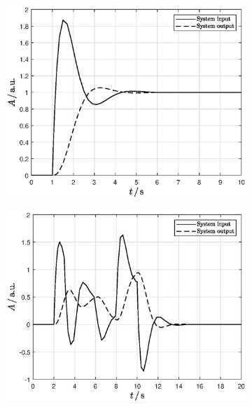 \begin{figure}[ht]
    \hfill
    
    \begin{subfigure}[b]{0.45\textwidth}
    \includegraphics[width=\textwidth]{simulink/simulinkPlotStepSystem.eps}
    \caption{}
    \label{subfig:stepSystem}
    \end{subfigure}
    \begin{subfigure}[b]{0.45\textwidth}
    \includegraphics[width=\textwidth]{simulink/simulinkPlotTrajectorySystem.eps}
    \caption{}
    \label{subfig:trajSystem}
    \end{subfigure}

    \hfill
    

\end{figure}
